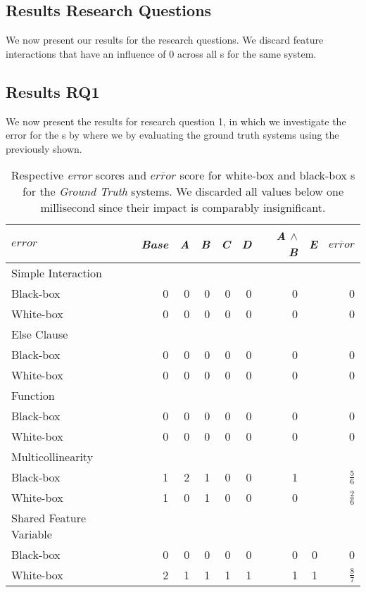 \subsection{Results Research Questions}
We now present our results for the research questions. We discard feature interactions that have an influence of 0 
across all {\perfInfluenceModel}s for the same system.

\subsection*{Results RQ1}

We now present the results for research question 1, in which we investigate the error for the {\perfInfluenceModel}s by
where we by evaluating the ground truth systems using the {\perfInfluenceModel} previously
shown.

\begin{table}[H]
    \centering
    \begin{tabular}{lrrrrrrrr}    \toprule
    $error$  &  \emph{Base} & \emph{A} & \emph{B} & \emph{C} & \emph{D} & \emph{A} $\land$ \emph{B} & \emph{E} & $\overline{error}$  \\ \midrule
    Simple Interaction &  &  & &  &  &  &     \\
    Black-box & 0 & 0 & 0 & 0 & 0 & 0  &  & 0  \\
    White-box & 0 & 0 & 0 & 0 & 0 & 0  &  & 0  \\ \midrule
    Else Clause &  &  & &  &  &  &     \\
    Black-box & 0 & 0 & 0 & 0 & 0 & 0  &  & 0  \\
    White-box & 0 & 0 & 0 & 0 & 0 & 0  &  & 0  \\ \midrule
    Function &  &  & &  &  &  &     \\
    Black-box & 0 & 0 & 0 & 0 & 0 & 0  &  & 0  \\
    White-box & 0 & 0 & 0 & 0 & 0 & 0  &  & 0  \\ \midrule
    Multicollinearity &  &  & &  &  &  &     \\
    Black-box & 1 & 2 & 1 & 0 & 0 & 1  &  & $\frac{5}{6}$ \\
    White-box & 1 & 0 & 1 & 0 & 0 & 0  &  & $\frac{2}{6}$ \\ \midrule
    Shared Feature Variable &  &  & &  &  &  &     \\
    Black-box & 0 & 0 & 0 & 0 & 0 & 0  & 0 &  0 \\
    White-box & 2 & 1 & 1 & 1 & 1 & 1  & 1 &  $\frac{8}{7}$ \\ \bottomrule
    \end{tabular}
    \caption{Respective \emph{error} scores and $\overline{error}$ score for white-box and black-box {\perfInfluenceModel}s for the \emph{Ground Truth} systems. 
    We discarded all values below one millisecond since their impact is comparably insignificant.}
    \label{rq1:ground-truth-results}
\end{table}


